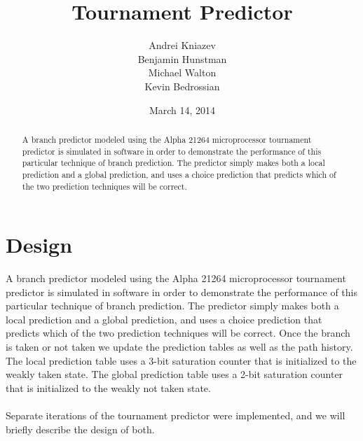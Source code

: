 \documentclass[]{report}   %
\begin{document}

\title{Tournament Predictor}   %
\author{Andrei Kniazev\\
  Benjamin Hunstman\\
  Michael Walton\\
  Kevin Bedrossian\\
}         %
\date{March 14, 2014}    %
\maketitle

\begin{abstract}
  A branch predictor modeled using the Alpha 21264 microprocessor tournament predictor is simulated in software in order to demonstrate the performance of this particular technique of branch prediction.
  The predictor simply makes both a local prediction and a global prediction, and uses a choice prediction that predicts which of the two prediction techniques will be correct.
\end{abstract}

\tableofcontents

\chapter{Design}
\par{A branch predictor modeled using the Alpha 21264 microprocessor tournament predictor is simulated in software in order to demonstrate the performance of this particular technique of branch prediction.
The predictor simply makes both a local prediction and a global prediction, and uses a choice prediction that predicts which of the two prediction techniques will be correct.
Once the branch is taken or not taken we update the prediction tables as well as the path history.
The local prediction table uses a 3-bit saturation counter that is initialized to the weakly taken state.
The global prediction table uses a 2-bit saturation counter that is initialized to the weakly not taken state.}\\\\
Separate iterations of the tournament predictor were implemented, and we will briefly describe the design of both.
\end{document}
